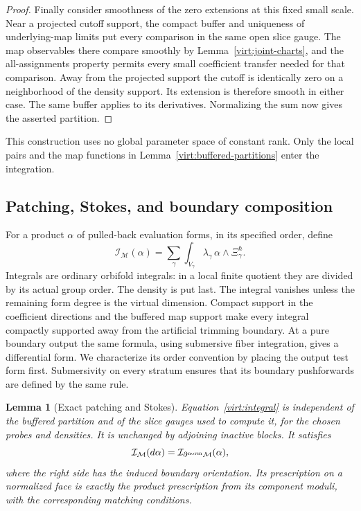 \documentclass[11pt]{article}
\newtheorem{lemma}[theorem]{Lemma}
\theoremstyle{definition}
\theoremstyle{remark}
\numberwithin{equation}{section}
\begin{document}
\begin{proof}
Finally consider smoothness of the zero extensions at this fixed small
scale.  Near a projected cutoff support, the compact buffer and
uniqueness of underlying-map limits put every comparison in the same
open slice gauge.  The map observables there compare smoothly by
Lemma~\ref{virt:joint-charts}, and the all-assignments property permits
every small coefficient transfer needed for that comparison.  Away
from the projected support the cutoff is identically zero on a
neighborhood of the density support.  Its extension is therefore
smooth in either case.  The same buffer applies to its derivatives.
Normalizing the sum now gives the asserted partition.
\end{proof}

This construction uses no global parameter space of constant rank.
Only the local pairs and the map functions in
Lemma~\ref{virt:buffered-partitions} enter the integration.

\subsection{Patching, Stokes, and boundary composition}

For a product $\alpha$ of pulled-back evaluation forms, in its specified
order, define
\begin{equation}\label{virt:integral}
 \mathcal I_{\mathcal M}(\alpha)
   =\sum_\gamma\int_{V_\gamma}
           \lambda_\gamma\,\alpha\wedge\Xi_\gamma^\hbar.
\end{equation}
Integrals are ordinary orbifold integrals: in a local finite quotient
they are divided by its actual group order.  The density is put last.
The integral vanishes unless the remaining form degree is the virtual
dimension.  Compact support in the coefficient directions and the
buffered map support make every integral compactly supported away from
the artificial trimming boundary.  At a pure boundary output the same
formula, using submersive fiber integration, gives a differential form.
We characterize its order convention by placing the output test form
first.  Submersivity on every stratum ensures that its boundary
pushforwards are defined by the same rule.

\begin{lemma}[Exact patching and Stokes]\label{virt:patching}
Equation~\eqref{virt:integral} is independent of the buffered partition
and of the slice gauges used to compute it, for the chosen probes and
densities.  It is unchanged by adjoining inactive blocks.  It satisfies
\[
 \mathcal I_{\mathcal M}(d\alpha)
       =\mathcal I_{\partial^{\rm norm}\mathcal M}(\alpha),
\]
where the right side has the induced boundary orientation.  Its
prescription on a normalized face is exactly the product prescription
from its component moduli, with the corresponding matching conditions.
\end{lemma}
\end{document}
